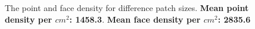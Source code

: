 \documentclass[final,12pt,3p]{elsarticle}
\begin{document}
\begin{figure}[!ht]
	\centering
	\hfill
	\caption{\label{fig:density} The point and face density for difference patch sizes. \textbf{Mean point density per $cm^2$: 1458.3}. \textbf{Mean face density per $cm^2$: 2835.6}}
\end{figure}
\end{document}
